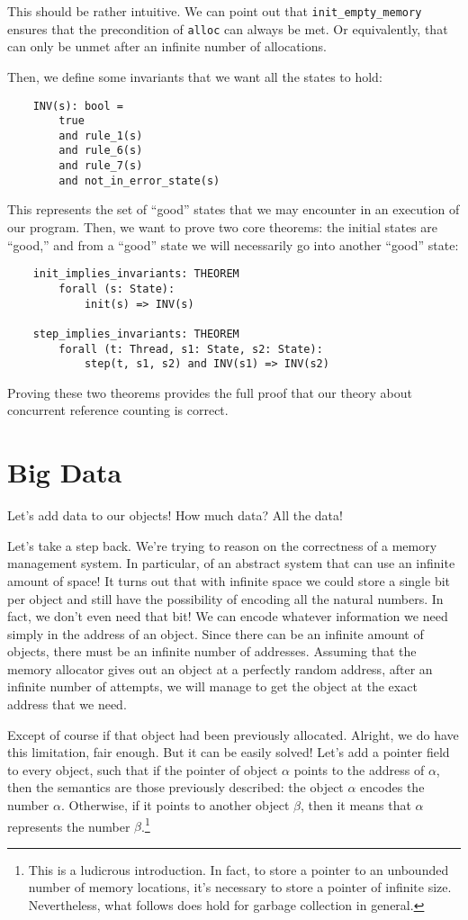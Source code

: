 This should be rather intuitive.
We can point out that \texttt{init\_empty\_memory} ensures that the precondition of \texttt{alloc} can always be met.
Or equivalently, that can only be unmet after an infinite number of allocations.

Then, we define some invariants that we want all the states to hold:
\begin{verbatim}
	INV(s): bool =
	    true
	    and rule_1(s)
	    and rule_6(s)
	    and rule_7(s)
	    and not_in_error_state(s)
\end{verbatim}

This represents the set of ``good'' states that we may encounter in an execution of our program.
Then, we want to prove two core theorems: the initial states are ``good,'' and from a ``good'' state we will necessarily go into another ``good'' state:
\begin{verbatim}
	init_implies_invariants: THEOREM
	    forall (s: State):
	        init(s) => INV(s)

	step_implies_invariants: THEOREM
	    forall (t: Thread, s1: State, s2: State):
	        step(t, s1, s2) and INV(s1) => INV(s2)
\end{verbatim}

Proving these two theorems provides the full proof that our theory about concurrent reference counting is correct.


\section{Big Data}\label{sec:big-data}

Let's add data to our objects!
How much data?
All the data!

Let's take a step back.
We're trying to reason on the correctness of a memory management system.
In particular, of an abstract system that can use an infinite amount of space!
It turns out that with infinite space we could store a single bit per object and still have the possibility of encoding all the natural numbers.
In fact, we don't even need that bit!
We can encode whatever information we need simply in the address of an object.
Since there can be an infinite amount of objects, there must be an infinite number of addresses.
Assuming that the memory allocator gives out an object at a perfectly random address, after an infinite number of attempts, we will manage to get the object at the exact address that we need.

Except of course if that object had been previously allocated.
Alright, we do have this limitation, fair enough.
But it can be easily solved!
Let's add a pointer field to every object, such that if the pointer of object $\alpha$ points to the address of $\alpha$, then the semantics are those previously described: the object $\alpha$ encodes the number $\alpha$.
Otherwise, if it points to another object $\beta$, then it means that $\alpha$ represents the number $\beta$.\footnote{%
	This is a ludicrous introduction.
	In fact, to store a pointer to an unbounded number of memory locations, it's necessary to store a pointer of infinite size.
	Nevertheless, what follows does hold for garbage collection in general.
}

